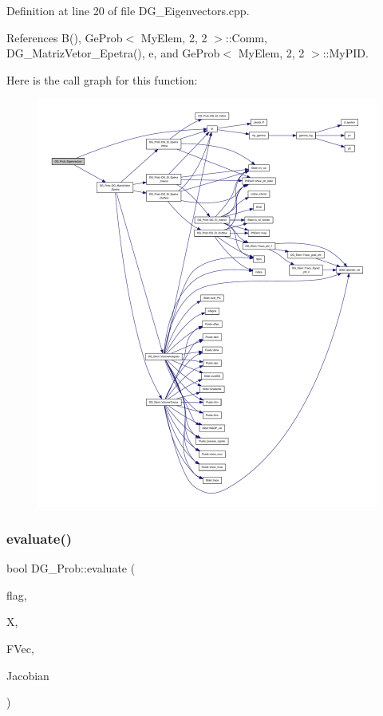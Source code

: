Definition at line 20 of file D\+G\+\_\+\+Eigenvectors.\+cpp.



References B(), Ge\+Prob$<$ My\+Elem, 2, 2 $>$\+::\+Comm, D\+G\+\_\+\+Matriz\+Vetor\+\_\+\+Epetra(), e, and Ge\+Prob$<$ My\+Elem, 2, 2 $>$\+::\+My\+P\+ID.

Here is the call graph for this function\+:
\nopagebreak
\begin{figure}[H]
\begin{center}
\leavevmode
\includegraphics[width=350pt]{classDG__Prob_a23d58d1583859acafd9a6d5888424374_cgraph}
\end{center}
\end{figure}
\mbox{\label{classDG__Prob_a688755c84a90df6d927d9a10a286878f}} 
\subsubsection{\texorpdfstring{evaluate()}{evaluate()}}
{\footnotesize\ttfamily bool D\+G\+\_\+\+Prob\+::evaluate (\begin{DoxyParamCaption}\item[{const \hyperlink{GeProb_8hpp_a1a1e1116ad09d261fce9538a3cf76060}{Fill\+Type}}]{flag,  }\item[{const Epetra\+\_\+\+Vector $\ast$}]{X,  }\item[{Epetra\+\_\+\+Vector $\ast$}]{F\+Vec,  }\item[{Epetra\+\_\+\+Row\+Matrix $\ast$}]{Jacobian }\end{DoxyParamCaption})}

